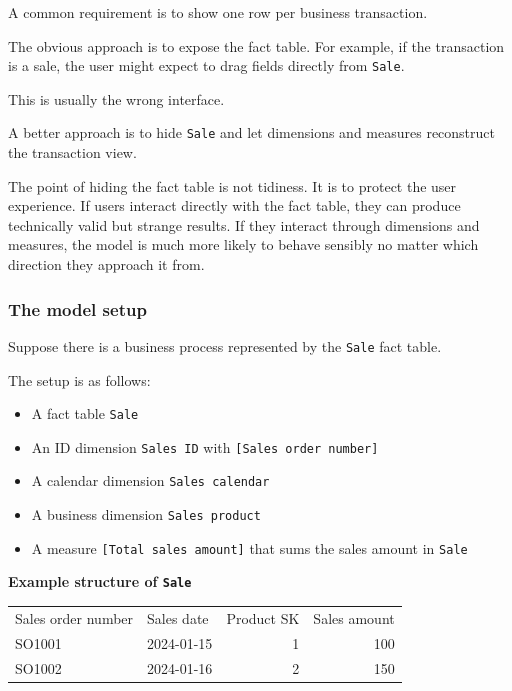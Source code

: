 \documentclass[10pt,openany,10pt]{book}
\providecommand{\tightlist}{%
  \setlength{\itemsep}{0pt}\setlength{\parskip}{0pt}}
\newcounter{none}
\let\podeToprule\toprule
\let\podeMidrule\midrule
\let\podeBottomrule\bottomrule
\renewcommand{\toprule}{\arrayrulecolor{pbiGrid}\podeToprule}
\renewcommand{\midrule}{\arrayrulecolor{pbiGrid}\podeMidrule}
\renewcommand{\bottomrule}{\arrayrulecolor{pbiGrid}\podeBottomrule}
\begin{document}
A common requirement is to show one row per business transaction.

The obvious approach is to expose the fact table. For example, if the
transaction is a sale, the user might expect to drag fields directly
from \texttt{\textquotesingle{}Sale\textquotesingle{}}.

This is usually the wrong interface.

A better approach is to hide
\texttt{\textquotesingle{}Sale\textquotesingle{}} and let dimensions and
measures reconstruct the transaction view.

The point of hiding the fact table is not tidiness. It is to protect the
user experience. If users interact directly with the fact table, they
can produce technically valid but strange results. If they interact
through dimensions and measures, the model is much more likely to behave
sensibly no matter which direction they approach it from.

\subsubsection{The model setup}\label{the-model-setup}

Suppose there is a business process represented by the
\texttt{\textquotesingle{}Sale\textquotesingle{}} fact table.

The setup is as follows:

\begin{itemize}
\tightlist
\item
  A fact table \texttt{\textquotesingle{}Sale\textquotesingle{}}
\item
  An ID dimension \texttt{\textquotesingle{}Sales\ ID\textquotesingle{}}
  with \texttt{{[}Sales\ order\ number{]}}
\item
  A calendar dimension
  \texttt{\textquotesingle{}Sales\ calendar\textquotesingle{}}
\item
  A business dimension
  \texttt{\textquotesingle{}Sales\ product\textquotesingle{}}
\item
  A measure \texttt{{[}Total\ sales\ amount{]}} that sums the sales
  amount in \texttt{\textquotesingle{}Sale\textquotesingle{}}
\end{itemize}

\textbf{Example structure of
\texttt{\textquotesingle{}Sale\textquotesingle{}}}

{\def\LTcaptype{none} %
\begin{longtable}[]{@{}llrr@{}}
\toprule\noalign{}
Sales order number & Sales date & Product SK & Sales amount \\
\midrule\noalign{}
\endhead
\bottomrule\noalign{}
\endlastfoot
SO1001 & 2024-01-15 & 1 & 100 \\
SO1002 & 2024-01-16 & 2 & 150 \\
\end{longtable}
}
\end{document}
